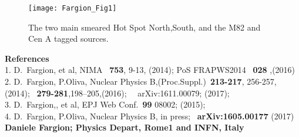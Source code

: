 \documentclass[twocolumn,twoside,10pt,nodate]{article}
\begin{document}
\begin{figure}[h]
\centering
\texttt{[image: Fargion\_Fig1]}
\caption{\small
The two main smeared Hot Spot North,South, and the M82 and Cen A tagged sources.} %
\end{figure}
\vfill
\small{
\noindent
\textbf{References}
\\
1. D.~Fargion, et al, NIMA \ \textbf{753}, 9-13, (2014); PoS FRAPWS2014 \ \textbf{028} ,(2016)\\
2. D.~Fargion, P.Oliva, Nuclear Physics B,(Proc.Suppl.)\ \textbf{213-217}, 256-257,(2014); \ \textbf{279-281},198--205,(2016);
   \ \ arXiv:1611.00079; (2017);\\
3. D.~Fargion,, et al, EPJ Web Conf.\ \textbf{99}  08002; (2015);\\
4.  D.~Fargion, P.Oliva, Nuclear Physics B, in press; \ \textbf{arXiv:1605.00177} (2017)\\
\textbf{Daniele Fargion; Physics Depart, Rome1 and INFN, Italy}
}
\end{document}
